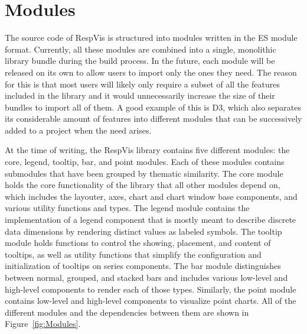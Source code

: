\chapter{Modules}
\label{chap:Modules}

The source code of RespVis is structured into modules written in the ES module format.
Currently, all these modules are combined into a single, monolithic library bundle during the build process.
In the future, each module will be released on its own to allow users to import only the ones they need.
The reason for this is that most users will likely only require a subset of all the features included in the library and it would unnecessarily increase the size of their bundles to import all of them.
A good example of this is D3, which also separates its considerable amount of features into different modules that can be successively added to a project when the need arises.

At the time of writing, the RespVis library contains five different modules: the core, legend, tooltip, bar, and point modules.
Each of these modules contains submodules that have been grouped by thematic similarity.
The core module holds the core functionality of the library that all other modules depend on, which includes the layouter, axes, chart and chart window base components, and various utility functions and types.
The legend module contains the implementation of a legend component that is mostly meant to describe discrete data dimensions by rendering distinct values as labeled symbols.
The tooltip module holds functions to control the showing, placement, and content of tooltips, as well as utility functions that simplify the configuration and initialization of tooltips on series components.
The bar module distinguishes between normal, grouped, and stacked bars and includes various low-level and high-level components to render each of those types.
Similarly, the point module contains low-level and high-level components to visualize point charts.
All of the different modules and the dependencies between them are shown in Figure~\ref{fig:Modules}. 

